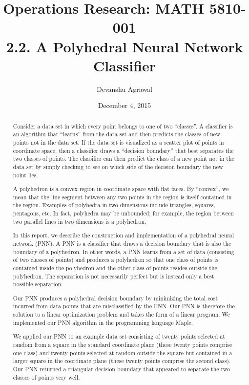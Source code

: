 \documentclass[12pt, a4paper, notitlepage]{report}
\title{Operations Research: MATH 5810-001 \\
   2.2. A Polyhedral Neural Network Classifier }  %
\author{Devanshu Agrawal}  %
\date{December 4, 2015}  %
\begin{document}
\maketitle

\begin{abstract}
Consider a data set in which every point belongs to one of two ``classes''. A classifier is an algorithm that ``learns'' from the data set and then predicts the classes of new points not in the data set. If the data set is visualized as a scatter plot of points in coordinate space, then a classifier draws a ``decision boundary'' that best separates the two classes of points. The classifier can then predict the class of a new point not in the data set by simply checking to see on which side of the decision boundary the new point lies.

A polyhedron is a convex region in coordinate space with flat faces. By ``convex'', we mean that the line segment between any two points in the region is itself contained in the region. Examples of polyhedra in two dimensions include triangles, squares, pentagons, etc. In fact, polyhedra may be unbounded; for example, the region between two parallel lines in two dimensions is a polyhedron.

In this report, we describe the construction and implementation of a polyhedral neural network (PNN). A PNN is a classifier that draws a decision boundary that is also the boundary of a polyhedron. In other words, a PNN learns from a set of data (consisting of two classes of points) and produces a polyhedron so that one class of points is contained inside the polyhedron and the other class of points resides outside the polyhedron. The separation is not necessarily perfect but is instead only a best possible separation.

Our PNN produces a polyhedral decision boundary by minimizing the total cost incurred from data points that are misclassified by the PNN. Our PNN is therefore the solution to a linear optimization problem and takes the form of a linear program. We implemented our PNN algorithm in the programming language Maple.

We applied our PNN to an example data set consisting of twenty points selected at random from a square in the standard coordinate plane (these twenty points comprise one class) and twenty points selected at random outside the square but contained in a larger square in the coordinate plane (these twenty points comprise the second class). Our PNN returned a triangular decision boundary that appeared to separate the two classes of points very well.
\end{abstract}
\end{document}
